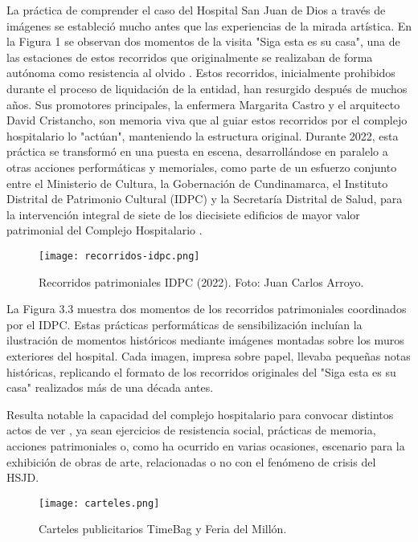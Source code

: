 La práctica de comprender el caso del Hospital San Juan de Dios a través de imágenes se estableció mucho antes que las experiencias de la mirada artística. En la Figura 1 se observan dos momentos de la visita "Siga esta es su casa", una de las estaciones de estos recorridos que originalmente se realizaban de forma autónoma como resistencia al olvido \parencite{Gongora2013}. Estos recorridos, inicialmente prohibidos durante el proceso de liquidación de la entidad, han resurgido después de muchos años. Sus promotores principales, la enfermera Margarita Castro y el arquitecto David Cristancho, son memoria viva que al guiar estos recorridos por el complejo hospitalario lo "actúan", manteniendo la estructura original. Durante 2022, esta práctica se transformó en una puesta en escena, desarrollándose en paralelo a otras acciones performáticas y memoriales, como parte de un esfuerzo conjunto entre el Ministerio de Cultura, la Gobernación de Cundinamarca, el Instituto Distrital de Patrimonio Cultural (IDPC) y la Secretaría Distrital de Salud, para la intervención integral de siete de los diecisiete edificios de mayor valor patrimonial del Complejo Hospitalario \parencite{IDPCSanJuanDeDios}.
    
\begin{figure}[ht]
    \centering
    \texttt{[image: recorridos-idpc.png]}
    \caption{Recorridos patrimoniales IDPC (2022). Foto: Juan Carlos Arroyo.}
\end{figure}

La Figura 3.3 muestra dos momentos de los recorridos patrimoniales coordinados por el IDPC. Estas prácticas performáticas de sensibilización \parencite{Guasch2011} incluían la ilustración de momentos históricos mediante imágenes montadas sobre los muros exteriores del hospital. Cada imagen, impresa sobre papel, llevaba pequeñas notas históricas, replicando el formato de los recorridos originales del "Siga esta es su casa" realizados más de una década antes.

Resulta notable la capacidad del complejo hospitalario para convocar distintos actos de ver \parencite{Abril2007}, ya sean ejercicios de resistencia social, prácticas de memoria, acciones patrimoniales o, como ha ocurrido en varias ocasiones, escenario para la exhibición de obras de arte, relacionadas o no con el fenómeno de crisis del HSJD.

\begin{figure}[ht]
    \centering
    \texttt{[image: carteles.png]}
    \caption{Carteles publicitarios TimeBag y Feria del Millón.}
\end{figure}

